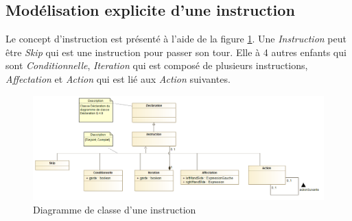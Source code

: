 
\subsection{Modélisation explicite d'une instruction}
\label{sec:question13}

Le concept d'instruction est présenté à l'aide de la figure \ref{fig:instruction}. Une \emph{Instruction} peut être \emph{Skip} qui est une instruction pour passer son tour. Elle à 4 autres enfants qui sont \emph{Conditionnelle}, \emph{Iteration} qui est composé
de plusieurs instructions, \emph{Affectation} et \emph{Action} qui est lié aux \emph{Action} suivantes.

\begin{figure}
	\centering
	\includegraphics[width=500pt]{assets/class__Instruction}
	\caption{Diagramme de classe d'une instruction}
	\label{fig:instruction}
\end{figure}